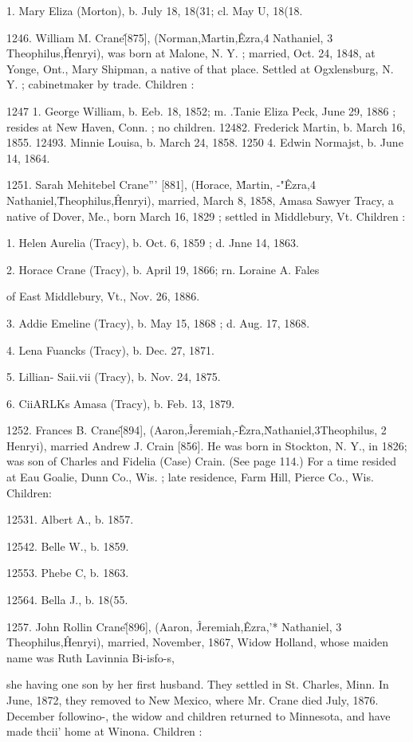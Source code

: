 1. Mary Eliza (Morton), b. July 18, 18(31; cl. May U, 18(18. 

1246. William M. Crane\^ [875], (Norman,\^ Martin,\^ Ezra,4 
Nathaniel, 3 Theophilus,\^ Henryi), was born at Malone, N. Y. ; 
married, Oct. 24, 1848, at Yonge, Ont., Mary Shipman, a native 
of that place. Settled at Ogxlensburg, N. Y. ; cabinetmaker by 
trade. Children : 

1247  1. George William, b. Eeb. 18, 1852; m. .Tanie Eliza Peck, 
June 29, 1886 ; resides at New Haven, Conn. ; no children. 
12482. Frederick Martin, b. March 16, 1855. 
12493. Minnie Louisa, b. March 24, 1858. 
1250  4. Edwin Normajst, b. June 14, 1864. 

1251. Sarah Mehitebel Crane''' [881], (Horace, \^ Martin, -"\^ 
Ezra,4 Nathaniel,\^ Theophilus,\^ Henryi), married, March 8, 1858, 
Amasa Sawyer Tracy, a native of Dover, Me., born March 16, 
1829 ; settled in Middlebury, Vt. Children : 

1. Helen Aurelia (Tracy), b. Oct. 6, 1859 ; d. Jnne 14, 1863. 

2. Horace Crane (Tracy), b. April 19, 1866; rn. Loraine A. Fales 

of East Middlebury, Vt., Nov. 26, 1886. 

3. Addie Emeline (Tracy), b. May 15, 1868 ; d. Aug. 17, 1868. 

4. Lena Fuancks (Tracy), b. Dec. 27, 1871. 

5. Lillian- Saii.vii (Tracy), b. Nov. 24, 1875. 

6. CiiARLKs Amasa (Tracy), b. Feb. 13, 1879. 

1252. Frances B. Crane\^ [894], (Aaron,\^ Jeremiah,-\^ Ezra,\^ 
Nathaniel,3Theophilus, 2 Henryi), married Andrew J. Crain [856]. 
He was born in Stockton, N. Y., in 1826; was son of Charles 
and Fidelia (Case) Crain. (See page 114.) For a time resided 
at Eau Goalie, Dunn Co., Wis. ; late residence, Farm Hill, Pierce 
Co., Wis. Children: 

12531. Albert A., b. 1857. 

12542. Belle W., b. 1859. 

12553. Phebe C, b. 1863. 

12564. Bella J., b. 18(55. 

1257. John Rollin Crane\^ [896], (Aaron, \^ Jeremiah,\^ Ezra,'* 
Nathaniel, 3 Theophilus,\^ Henryi), married, November, 1867, 
Widow Holland, whose maiden name was Ruth Lavinnia Bi-isfo-s, 




she having one son by her first husband. They settled in St. 
Charles, Minn. In June, 1872, they removed to New Mexico, 
where Mr. Crane died July, 1876. December followino-, the 
widow and children returned to Minnesota, and have made thcii' 
home at Winona. Children : 

